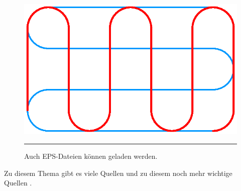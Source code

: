 \Blindtext[2]


\begin{figure}[h!]
	\centering
	\includegraphics[width=0.4\linewidth]{img/EPS}
	\vspace{2mm}
	\hrule
	\caption{Auch EPS-Dateien können geladen werden.}
	\label{fig:fig_eps}
\end{figure}


\Blindtext

Zu diesem Thema gibt es viele Quellen \Cite{Report2019,Conference2019}  und zu diesem noch mehr wichtige Quellen \Cite{Article2019,Book2019}.

%
%
%

